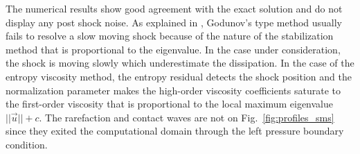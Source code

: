 \documentclass[preprint,10pt]{elsarticle}
\newcommand{\fig}[1]{Fig.~\ref{#1}}                      %
\begin{document}
The numerical results show good agreement with the exact solution and do not display any post shock noise. As explained in \cite{roberts}, Godunov's type method usually fails to resolve a slow moving shock because of the nature of the stabilization method that is proportional to the eigenvalue. In the case under consideration, the shock is moving slowly which underestimate the dissipation. In the case of the entropy viscosity method, the entropy residual detects the shock position and the normalization parameter makes the high-order viscosity coefficients saturate to the first-order viscosity that is proportional to the local maximum eigenvalue $||\vec{u}||+c$. The rarefaction and contact waves are not on \fig{fig:profiles_sms} since they exited the computational domain through the left pressure boundary condition. 
\end{document}
